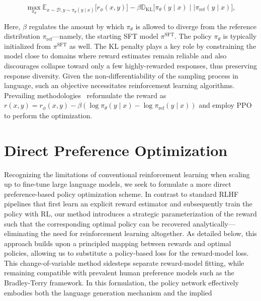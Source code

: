 \begin{equation}\label{eq:RL}
\max_{\pi_{\theta}}  \mathbb{E}_{x\sim \mathcal{D}, y\sim \pi_{\theta}(y \mid x)}\bigl[r_{\phi}(x, y)\bigr] - \beta\mathbb{D}_{\textrm{KL}}\bigl[\pi_{\theta}(y\mid x)\mid \mid \pi_\text{ref}(y\mid x)\bigr],
\end{equation}

Here, $\beta$ regulates the amount by which $\pi_\theta$ is allowed to diverge from the reference distribution $\pi_\text{ref}$—namely, the starting SFT model $\pi^\text{SFT}$. The policy $\pi_\theta$ is typically initialized from $\pi^\text{SFT}$ as well. The KL penalty plays a key role by constraining the model close to domains where reward estimates remain reliable and also discourages collapse toward only a few highly-rewarded responses, thus preserving response diversity. Given the non-differentiability of the sampling process in language, such an objective necessitates reinforcement learning algorithms. Prevailing methodologies~\citep{ziegler2020finetuning, stiennon2022learning, bai2022training, ouyang2022training} reformulate the reward as ${r(x, y) = r_{\phi}(x, y) -\beta (\log \pi_{\theta}(y\mid x) - \log \pi_\text{ref}(y\mid x))}$ and employ PPO~\cite{schulman2017proximal} to perform the optimization.

\section{Direct Preference Optimization}\label{sec:DPO}

Recognizing the limitations of conventional reinforcement learning when scaling up to fine-tune large language models, we seek to formulate a more direct preference-based policy optimization scheme. In contrast to standard RLHF pipelines that first learn an explicit reward estimator and subsequently train the policy with RL, our method introduces a strategic parameterization of the reward such that the corresponding optimal policy can be recovered analytically—eliminating the need for reinforcement learning altogether. As detailed below, this approach builds upon a principled mapping between rewards and optimal policies, allowing us to substitute a policy-based loss for the reward-model loss. This change-of-variable method sidesteps separate reward-model fitting, while remaining compatible with prevalent human preference models such as the Bradley-Terry framework. In this formulation, the policy network effectively embodies both the language generation mechanism and the implied

